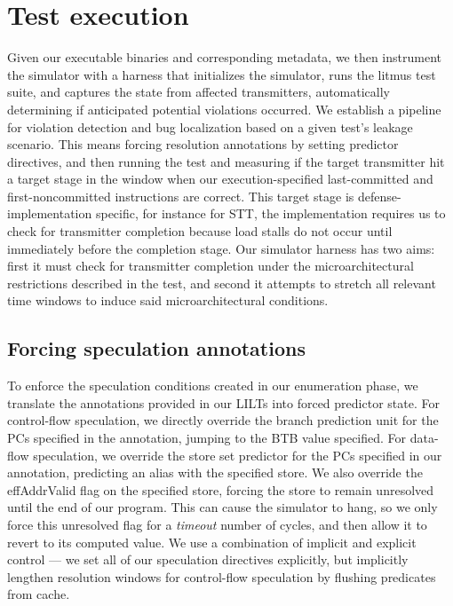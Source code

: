 \section{Test execution}
Given our executable binaries and corresponding metadata, we then instrument the simulator with a harness that initializes the simulator, runs the litmus test suite, and captures the state from affected transmitters, automatically determining if anticipated potential violations occurred. We establish a pipeline for violation detection and bug localization based on a given test's leakage scenario. This means forcing resolution annotations by setting predictor directives, and then running the test and measuring if the target transmitter hit a target stage in the window when our execution-specified last-committed and first-noncommitted instructions are correct. This target stage is defense-implementation specific, for instance for STT, the implementation requires us to check for transmitter completion because load stalls do not occur until immediately before the completion stage.  Our simulator harness has two aims: first it must check for transmitter completion under the microarchitectural restrictions described in the test, and second it attempts to stretch all relevant time windows to induce said microarchitectural conditions.

\subsection{Forcing speculation annotations}
To enforce the speculation conditions created in our enumeration phase, we translate the annotations provided in our LILTs into forced predictor state. For control-flow speculation, we directly override the branch prediction unit for the PCs specified in the annotation, jumping to the BTB value specified. For data-flow speculation, we override the store set predictor for the PCs specified in our annotation, predicting an alias with the specified store. We also override the effAddrValid flag on the specified store, forcing the store to remain unresolved until the end of our program. This can cause the simulator to hang, so we only force this unresolved flag for a \textit{timeout} number of cycles, and then allow it to revert to its computed value. We use a combination of implicit and explicit control — we set all of our speculation directives explicitly, but implicitly lengthen resolution windows for control-flow speculation by flushing predicates from cache. 

